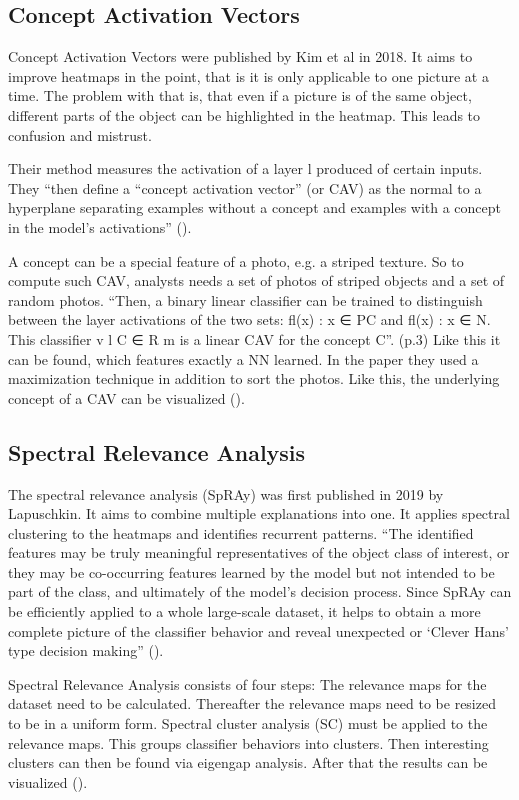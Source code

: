 \subsection{Concept Activation Vectors}
Concept Activation Vectors were published by Kim et al in 2018. It aims to improve heatmaps in the point, that is it is only applicable to one picture at a time. The problem with that is, that even if a picture is of the same object, different parts of the object can be highlighted in the heatmap. This leads to confusion and mistrust.
\par
Their method measures the activation of a layer l produced of certain inputs. They “then define a “concept activation vector” (or CAV) as the normal to a hyperplane separating examples without a concept and examples with a concept in the model’s activations” ().
\par
A concept can be a special feature of a photo, e.g. a striped texture. So to compute such CAV, analysts needs a set of photos of striped objects and a set of random photos.
“Then, a binary linear classifier can be trained to distinguish between the layer activations of the two sets: {fl(x) : x ∈ PC } and {fl(x) : x ∈ N}. This classifier v l C ∈ R m is a linear CAV for the concept C”. (p.3) Like this it can be found, which features exactly a NN learned.
In the paper they used a maximization technique in addition to sort the photos. Like this, the  underlying concept of a CAV can be visualized ().

\subsection{Spectral Relevance Analysis}
The spectral relevance analysis (SpRAy) was first published in 2019 by Lapuschkin. It aims to combine multiple explanations into one. It applies spectral clustering to the heatmaps and identifies recurrent patterns. “The identified features may be truly meaningful representatives of the object class of interest, or they may be co-occurring features learned by the model but not intended to be part of the class, and ultimately of the model’s decision process. Since SpRAy can be efficiently applied to a whole large-scale dataset, it helps to obtain a more complete picture of the classifier behavior and reveal unexpected or ‘Clever Hans’ type decision making” ().
\par
Spectral Relevance Analysis consists of four steps:
The relevance maps for the dataset need to be calculated.
Thereafter the relevance maps need to be resized to be in a uniform form.
Spectral cluster analysis (SC) must be applied to the relevance maps. This groups classifier behaviors into clusters.
Then interesting clusters can then be found via eigengap analysis.
After that the results can be visualized ().
